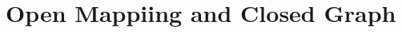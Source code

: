 \newpage
\section{Open Mappiing and Closed Graph}
\begin{comment}
\bsegin{comment}
\begin{definition}[Open map]\label{open map}\nl
	An open map is one for which the image of every open set is open.
\end{definition}
\begin{theorem}[Open Mapping Theorem]\label{OMT}\nl
	Let $X,Y$ be Banach spaces, $T:X\xrightarrow{}Y$ a continuous surjective linear map. Then $T$ is an open map.
\end{theorem}
\eend{comment}

\begin{definition}[Open Ball]\nl
	An open ball in normed linear space $X$ with radius $r>0$ centered at $x\in X$ is
	$$
		B_X(x,r)=\{y\in X:\norm{y-x}_X<r\}
	$$
	Also, when $x=0$ we write
	$$
		B_X(0,r)\equiv B_x(r)
	$$
\end{definition}

\begin{definition}[Open map]\label{open map}\nl
	Let $X$, $Y$ be linear spaces. \func{A}{X}{Y} is {\underline{open}} if $A(U)\subset Y $ is open.
\end{definition}

\begin{remark}\hfill

	\begin{itemize}
		\item $A$ being continuous means $A^{-1}(V)\subset{X}$ open $\forall V\subset Y$ open.
		\item $A$ being continuous need not be open. e.g. $Ax\stackrel{def}{=}0\in Y$
	\end{itemize}
\end{remark}

\begin{theorem}[Open Mapping Theorem]\label{OMT}\nl
	Let $X,Y$ be Banach, $A\subset\mathcal{L}(X,Y)$. Then:
	\begin{itemize}
		\item[i)] if $A$ is surjective, $A$ is open.
		\item[ii)] if $A$ is bijective, then $A^{-1}\in \mathcal{L}(X,Y)$. (Inverse operator theorem)
	\end{itemize}
\end{theorem}

\begin{remark}\nl
	ii) important in application. If $A\in\mathcal{L}(X,Y)$ is bijective then \func{A^{-1}}{X}{Y} liner is easy (why?). The point is $A^{-1}$ is also bounded, or equivalently continuous.
\end{remark}


\end{comment}
